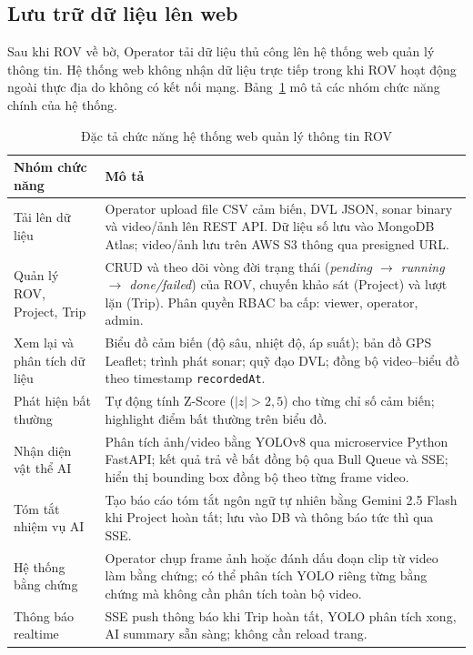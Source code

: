 \documentclass[../DoAn.tex]{subfiles}
\begin{document}
\subsection{Lưu trữ dữ liệu lên web}

Sau khi ROV về bờ, Operator tải dữ liệu thủ công lên hệ thống web quản lý thông tin. Hệ thống web không nhận dữ liệu trực tiếp trong khi ROV hoạt động ngoài thực địa do không có kết nối mạng. Bảng~\ref{tab:web_functions} mô tả các nhóm chức năng chính của hệ thống.

\begin{table}[H]
\centering
\renewcommand{\arraystretch}{1.3}
\begin{tabular}{|p{4cm}|p{9cm}|}
\hline
\textbf{Nhóm chức năng} & \textbf{Mô tả} \\
\hline
Tải lên dữ liệu &
Operator upload file CSV cảm biến, DVL JSON, sonar binary và video/ảnh lên REST API. Dữ liệu số lưu vào MongoDB Atlas; video/ảnh lưu trên AWS S3 thông qua presigned URL. \\
\hline
Quản lý ROV, Project, Trip &
CRUD và theo dõi vòng đời trạng thái (\textit{pending $\to$ running $\to$ done/failed}) của ROV, chuyến khảo sát (Project) và lượt lặn (Trip). Phân quyền RBAC ba cấp: viewer, operator, admin. \\
\hline
Xem lại và phân tích dữ liệu &
Biểu đồ cảm biến (độ sâu, nhiệt độ, áp suất); bản đồ GPS Leaflet; trình phát sonar; quỹ đạo DVL; đồng bộ video--biểu đồ theo timestamp \texttt{recordedAt}. \\
\hline
Phát hiện bất thường &
Tự động tính Z-Score ($|z|>2{,}5$) cho từng chỉ số cảm biến; highlight điểm bất thường trên biểu đồ. \\
\hline
Nhận diện vật thể AI &
Phân tích ảnh/video bằng YOLOv8 qua microservice Python FastAPI; kết quả trả về bất đồng bộ qua Bull Queue và SSE; hiển thị bounding box đồng bộ theo từng frame video. \\
\hline
Tóm tắt nhiệm vụ AI &
Tạo báo cáo tóm tắt ngôn ngữ tự nhiên bằng Gemini 2.5 Flash khi Project hoàn tất; lưu vào DB và thông báo tức thì qua SSE. \\
\hline
Hệ thống bằng chứng &
Operator chụp frame ảnh hoặc đánh dấu đoạn clip từ video làm bằng chứng; có thể phân tích YOLO riêng từng bằng chứng mà không cần phân tích toàn bộ video. \\
\hline
Thông báo realtime &
SSE push thông báo khi Trip hoàn tất, YOLO phân tích xong, AI summary sẵn sàng; không cần reload trang. \\
\hline
\end{tabular}
\caption{Đặc tả chức năng hệ thống web quản lý thông tin ROV}
\label{tab:web_functions}
\end{table}
\end{document}
